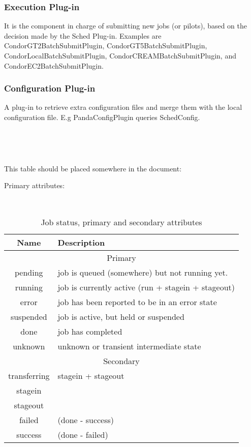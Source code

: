 \documentclass[a4paper]{jpconf}
\begin{document}
\subsubsection{Execution Plug-in} 

It is the component in charge of submitting new jobs (or pilots), 
based on the decision made by the Sched Plug-in. 
Examples are CondorGT2BatchSubmitPlugin, CondorGT5BatchSubmitPlugin, CondorLocalBatchSubmitPlugin, CondorCREAMBatchSubmitPlugin, 
and CondorEC2BatchSubmitPlugin.

\subsubsection{Configuration Plug-in} 

A plug-in to retrieve extra configuration files and merge them with the local configuration file.
E.g PandaConfigPlugin queries SchedConfig. 

~

~

This table should be placed somewhere in the document:


Primary attributes:

~

\begin{table}
\begin{tabular}{|c|l|}
\hline
\hline
Name & Description\tabularnewline
\hline
\hline
\multicolumn{2}{|c|}{Primary} \\
\hline
\hline
pending      &     job is queued (somewhere) but not running yet.      \\ \hline 
running      &     job is currently active (run + stagein + stageout)  \\ \hline
error        &     job has been reported to be in an error state       \\ \hline
suspended    &     job is active, but held or suspended                \\ \hline
done         &     job has completed                                   \\ \hline
unknown      &     unknown or transient intermediate state             \\ \hline
\hline
\hline
\multicolumn{2}{|c|}{Secondary} \\
\hline
\hline
transferring  &     stagein + stageout  \\ \hline
stagein       &                         \\ \hline
stageout      &                         \\ \hline
failed        &     (done - success)    \\ \hline
success       &     (done - failed)     \\ \hline
\end{tabular}\caption{Job status, primary and secondary attributes}
\label{job secondary status}
\end{table}
\end{document}
